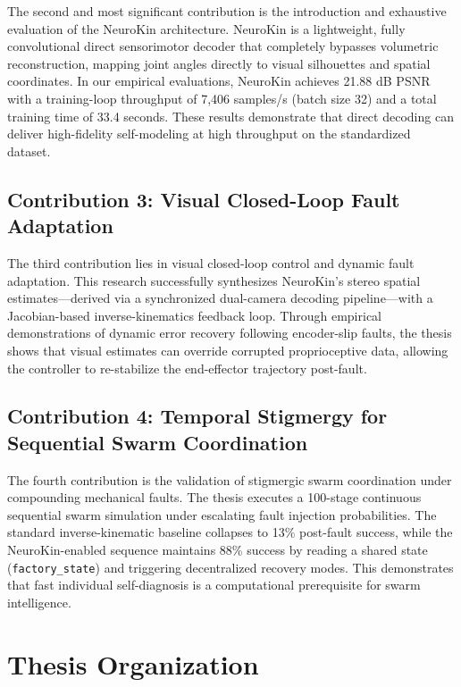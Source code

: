 \documentclass[12pt,a4paper,oneside]{report}
\begin{document}
The second and most significant contribution is the introduction and exhaustive evaluation of the NeuroKin architecture. NeuroKin is a lightweight, fully convolutional direct sensorimotor decoder that completely bypasses volumetric reconstruction, mapping joint angles directly to visual silhouettes and spatial coordinates. In our empirical evaluations, NeuroKin achieves 21.88 dB PSNR with a training-loop throughput of 7,406 samples/s (batch size 32) and a total training time of 33.4 seconds. These results demonstrate that direct decoding can deliver high-fidelity self-modeling at high throughput on the standardized dataset.

\subsection{Contribution 3: Visual Closed-Loop Fault Adaptation}
\label{subsec:contrib_closed_loop}

The third contribution lies in visual closed-loop control and dynamic fault adaptation. This research successfully synthesizes NeuroKin's stereo spatial estimates—derived via a synchronized dual-camera decoding pipeline—with a Jacobian-based inverse-kinematics feedback loop. Through empirical demonstrations of dynamic error recovery following encoder-slip faults, the thesis shows that visual estimates can override corrupted proprioceptive data, allowing the controller to re-stabilize the end-effector trajectory post-fault.

\subsection{Contribution 4: Temporal Stigmergy for Sequential Swarm Coordination}
\label{subsec:contrib_stigmergy}

The fourth contribution is the validation of stigmergic swarm coordination under compounding mechanical faults. The thesis executes a 100-stage continuous sequential swarm simulation under escalating fault injection probabilities. The standard inverse-kinematic baseline collapses to 13\% post-fault success, while the NeuroKin-enabled sequence maintains 88\% success by reading a shared state (\texttt{factory\_state}) and triggering decentralized recovery modes. This demonstrates that fast individual self-diagnosis is a computational prerequisite for swarm intelligence.

\section{Thesis Organization}
\label{sec:thesis_organization}
\end{document}
